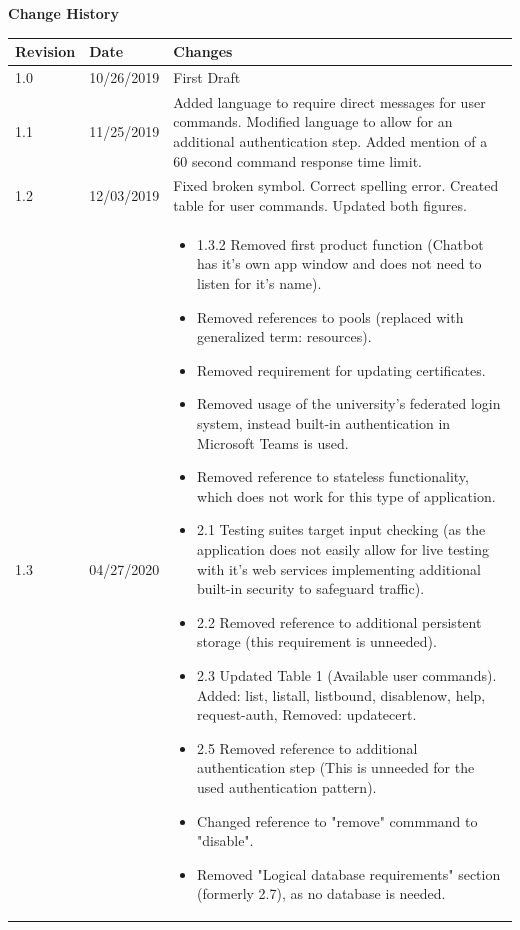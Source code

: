 \documentclass[onecolumn, draftclsnofoot,10pt, compsoc]{IEEEtran}
\begin{document}
\textbf{Change History}\par

\begin{tabular}{ p{1in} p{1in} p{4in} }
 \textbf{Revision} & \textbf{Date} & \textbf{Changes} \\
 \hline
 1.0 & 10/26/2019 
 & First Draft \\
 \hline
 1.1 & 11/25/2019 
 & Added language to require direct messages for user commands. Modified language to allow for an additional authentication step. Added mention of a 60 second command response time limit.\\
 \hline
 1.2 & 12/03/2019
 & Fixed broken symbol. Correct spelling error. Created table for user commands. Updated both figures.\\
 \hline
 1.3 & 04/27/2020
 &  \begin{itemize}
            \item 1.3.2 Removed first product function (Chatbot has it's own app window and does not need to listen for it's name).
            \item Removed references to pools (replaced with generalized term: resources).
            \item Removed requirement for updating certificates.
            \item Removed usage of the university's federated login system, instead built-in authentication in Microsoft Teams is used.
            \item Removed reference to stateless functionality, which does not work for this type of application.
            \item 2.1 Testing suites target input checking (as the application does not easily allow for live testing with it's web services implementing additional built-in security to safeguard traffic).
            \item 2.2 Removed reference to additional persistent storage (this requirement is unneeded).
            \item 2.3 Updated Table 1 (Available user commands). Added: list, listall, listbound, disablenow, help, request-auth, Removed: updatecert.
            \item 2.5 Removed reference to additional authentication step (This is unneeded for the used authentication pattern).
            \item Changed reference to "remove" commmand to "disable".
            \item Removed "Logical database requirements" section (formerly 2.7), as no database is needed.
        \end{itemize}    

            
\end{tabular}
\end{document}
